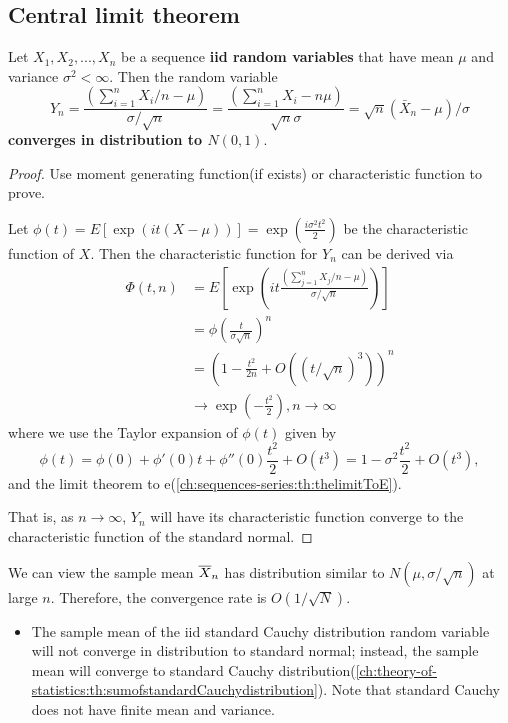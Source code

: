 \begin{refsection}
\subsection{Central limit theorem}
\begin{theorem}\cite[236]{casella2002statistical}\cite[313]{hoggintroduction}\label{ch:theory-of-probability:centralLimitTheorem}
Let $X_1,X_2,...,X_n$ be a sequence \textbf{iid random variables} that have mean $\mu$ and variance $\sigma^2 < \infty$. Then the random variable $$Y_n = \frac{(\sum_{i=1}^n X_i/n - \mu)}{\sigma/\sqrt{n}}= \frac{(\sum_{i=1}^n X_i - n\mu)}{\sqrt{n}\sigma} = \sqrt{n}(\bar{X}_n - \mu)/\sigma$$
\textbf{converges in distribution to $N(0,1)$}.
\end{theorem}
\begin{proof}
Use moment generating function(if exists) or characteristic function to prove.

Let $\phi(t) = E[\exp(it(X - \mu))] = \exp(\frac{i\sigma^2t^2}{2})$ be the characteristic function of $X$. 
Then the characteristic function for $Y_n$ can be derived via
\begin{align*}
\Phi(t,n) &= E[\exp(it \frac{(\sum_{j=1}^n X_j/n - \mu)}{\sigma/\sqrt{n}})] \\
&= \phi(\frac{t}{\sigma\sqrt{n}})^n \\
&= (1 - \frac{t^2}{2n} + O((t/\sqrt{n})^3))^n \\
& \to \exp(-\frac{t^2}{2}), n\to \infty
\end{align*}
where we use the Taylor expansion of $\phi(t)$ given by
$$\phi(t) = \phi(0) + \phi'(0)t + \phi''(0)\frac{t^2}{2} + O(t^3) = 1 - \sigma^2\frac{t^2}{2} + O(t^3),$$
and the limit theorem to e(\autoref{ch:sequences-series:th:thelimitToE}).

That is, as $n\to \infty$, $Y_n$ will have its characteristic function converge to the characteristic function of the standard normal.
\end{proof}



\begin{remark}
We can view the sample mean 
$\overline{X}_n$
has distribution similar to $N(\mu,\sigma/\sqrt{n})$
at large $n$. Therefore, the convergence rate is $O(1/\sqrt{N})$.
\end{remark}



\begin{remark}\hfill
\begin{itemize}
	\item The sample mean of the iid standard Cauchy distribution random variable will not converge in distribution to standard normal; instead, the sample mean will converge to standard Cauchy distribution(\autoref{ch:theory-of-statistics:th:sumofstandardCauchydistribution}). Note that standard Cauchy does not have finite mean and variance.
\end{itemize}
\end{remark}



\end{refsection}
